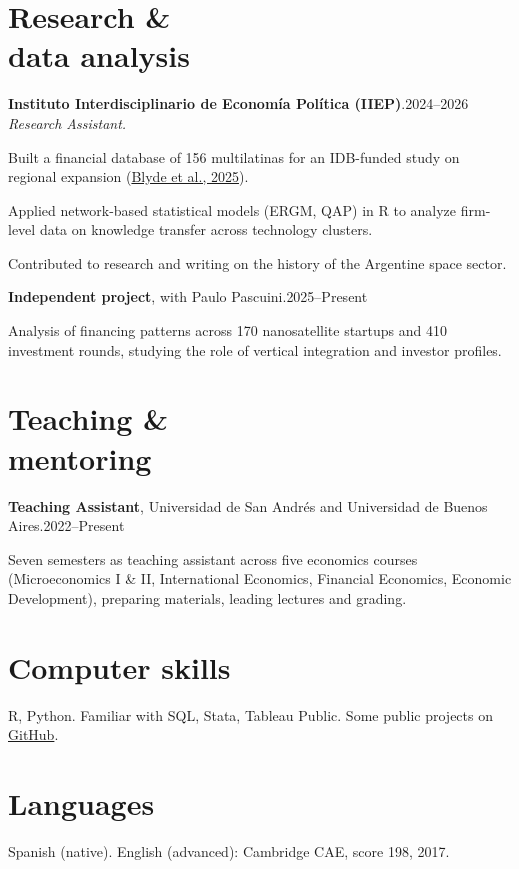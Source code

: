 \documentclass[11pt]{article}
\newcommand{\entrydate}[1]{\hfill{\small{#1}}}
\begin{document}
\section{Research \&\\data analysis}
\textbf{Instituto Interdisciplinario de Economía Política (IIEP)}.\entrydate{2024--2026}\\
\textit{Research Assistant.}
\begin{cvitems}
  \item Built a financial database of 156 multilatinas for an IDB-funded study on regional expansion (\href{https://publications.iadb.org/es/multilatinas-en-movimiento-caracteristicas-motivaciones-y-lineamientos-de-politica}{Blyde et al., 2025}).
  \item Applied network-based statistical models (ERGM, QAP) in R to analyze firm-level data on knowledge transfer across technology clusters.
  \item Contributed to research and writing on the history of the Argentine space sector.
\end{cvitems}

\smallskip
\textbf{Independent project}, with Paulo Pascuini.\entrydate{2025--Present}
\begin{cvitems}
  \item Analysis of financing patterns across 170 nanosatellite startups and 410 investment rounds, studying the role of vertical integration and investor profiles.
\end{cvitems}

\section{Teaching \&\\mentoring}
\textbf{Teaching Assistant}, Universidad de San Andrés and Universidad de Buenos Aires.\entrydate{2022--Present}
\begin{cvitems}
  \item Seven semesters as teaching assistant across five economics courses (Microeconomics I \& II, International Economics, Financial Economics, Economic Development), preparing materials, leading lectures and grading.
\end{cvitems}

\section{Computer skills}
    R, Python. Familiar with SQL, Stata, Tableau Public. Some public projects on \href{https://www.github.com/sanarovaz/}{GitHub}.
\section{Languages}
Spanish (native). English (advanced): Cambridge CAE, score 198, 2017.
\end{document}
